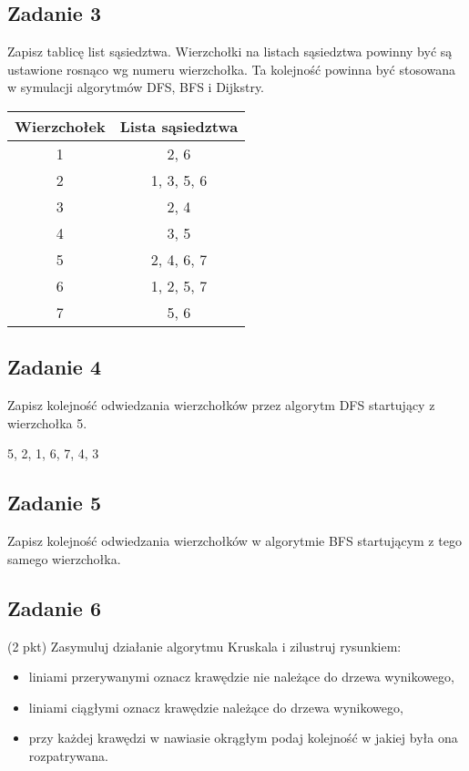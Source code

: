 \documentclass{article}
\begin{document}
\subsection*{Zadanie 3}
Zapisz tablicę list sąsiedztwa. Wierzchołki na listach sąsiedztwa powinny być są ustawione
rosnąco wg numeru wierzchołka. Ta kolejność powinna być stosowana w symulacji algorytmów DFS, BFS i Dijkstry.
\begin{center}
    \begin{tabular}{|c|c|}
        \hline
        Wierzchołek & Lista sąsiedztwa \\
        \hline
        1           & 2, 6             \\
        \hline
        2           & 1, 3, 5, 6       \\
        \hline
        3           & 2, 4             \\
        \hline
        4           & 3, 5             \\
        \hline
        5           & 2, 4, 6, 7       \\
        \hline
        6           & 1, 2, 5, 7       \\
        \hline
        7           & 5, 6             \\
        \hline
    \end{tabular}
\end{center}

\pagebreak
\subsection*{Zadanie 4}
Zapisz kolejność odwiedzania wierzchołków przez algorytm DFS startujący z wierzchołka 5.
\begin{center}
    5, 2, 1, 6, 7, 4, 3
\end{center}

\subsection*{Zadanie 5}
Zapisz kolejność odwiedzania wierzchołków w algorytmie BFS startującym z tego samego
wierzchołka.

\subsection*{Zadanie 6}
(2 pkt) Zasymuluj działanie algorytmu Kruskala i zilustruj rysunkiem:
\begin{itemize}
    \item liniami przerywanymi oznacz krawędzie nie należące do drzewa wynikowego,
    \item liniami ciągłymi oznacz krawędzie należące do drzewa wynikowego,
    \item przy każdej krawędzi w nawiasie okrągłym podaj kolejność w jakiej była ona rozpatrywana.
\end{itemize}
\end{document}
